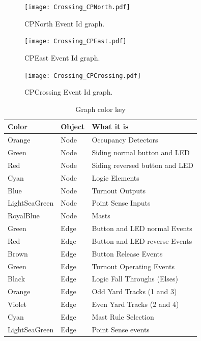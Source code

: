 \begin{figure}[hbpt]\begin{centering}%
\texttt{[image: Crossing\_CPNorth.pdf]}
\caption{CPNorth  Event Id graph.}
\label{fig:CrossingCPNorthEventFlow}
\end{centering}\end{figure}
\begin{figure}[hbpt]\begin{centering}%
\texttt{[image: Crossing\_CPEast.pdf]}
\caption{CPEast  Event Id graph.}
\label{fig:CrossingCPEastEventFlow}
\end{centering}\end{figure}
\begin{figure}[hbpt]\begin{centering}%
\texttt{[image: Crossing\_CPCrossing.pdf]}
\caption{CPCrossing Event Id graph.}
\label{fig:CrossingCPCrossing}
\end{centering}\end{figure}
\clearpage
\begin{table}[hbpt]\begin{centering}%
\begin{tabular}{|l|l|p{2in}|}
\hline
Color&Object&What it is\\
\hline
Orange&Node&Occupancy Detectors\\
\hline
Green&Node&Siding normal button and LED\\
\hline
Red&Node&Siding reversed button and LED\\
\hline
Cyan&Node&Logic Elements\\
\hline
Blue&Node&Turnout Outputs\\
\hline
LightSeaGreen&Node&Point Sense Inputs\\
\hline
RoyalBlue&Node&Masts\\
\hline 
Green&Edge&Button and LED normal Events\\
\hline
Red&Edge&Button and LED reverse Events\\
\hline
Brown&Edge&Button Release Events\\
\hline
Green&Edge&Turnout Operating Events\\
\hline
Black&Edge&Logic Fall Throughs (Elses)\\
\hline
Orange&Edge&Odd Yard Tracks (1 and 3)\\
\hline
Violet&Edge&Even Yard Tracks (2 and 4)\\
\hline
Cyan&Edge&Mast Rule Selection\\
\hline
LightSeaGreen&Edge&Point Sense events\\
\hline
\end{tabular}
\caption{Graph color key}
\label{tab:CrossingGraphKey}
\end{centering}\end{table}


\clearpage
